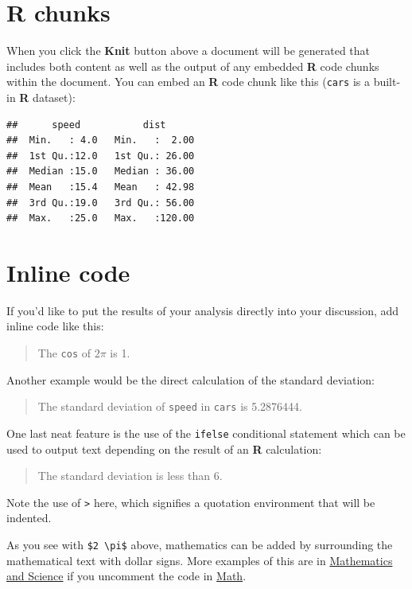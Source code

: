 \documentclass[print]{nuthesis}
\begin{document}
\hypertarget{r-chunks}{%
\section{R chunks}\label{r-chunks}}

When you click the \textbf{Knit} button above a document will be generated that includes both content as well as the output of any embedded \textbf{R} code chunks within the document. You can embed an \textbf{R} code chunk like this (\texttt{cars} is a built-in \textbf{R} dataset):

\begin{verbatim}
##      speed           dist       
##  Min.   : 4.0   Min.   :  2.00  
##  1st Qu.:12.0   1st Qu.: 26.00  
##  Median :15.0   Median : 36.00  
##  Mean   :15.4   Mean   : 42.98  
##  3rd Qu.:19.0   3rd Qu.: 56.00  
##  Max.   :25.0   Max.   :120.00
\end{verbatim}

\hypertarget{inline-code}{%
\section{Inline code}\label{inline-code}}

If you'd like to put the results of your analysis directly into your discussion, add inline code like this:

\begin{quote}
The \texttt{cos} of \(2 \pi\) is 1.
\end{quote}

Another example would be the direct calculation of the standard deviation:

\begin{quote}
The standard deviation of \texttt{speed} in \texttt{cars} is 5.2876444.
\end{quote}

One last neat feature is the use of the \texttt{ifelse} conditional statement which can be used to output text depending on the result of an \textbf{R} calculation:

\begin{quote}
The standard deviation is less than 6.
\end{quote}

Note the use of \texttt{\textgreater{}} here, which signifies a quotation environment that will be indented.

As you see with \texttt{\$2\ \textbackslash{}pi\$} above, mathematics can be added by surrounding the mathematical text with dollar signs. More examples of this are in \protect\hyperlink{math-sci}{Mathematics and Science} if you uncomment the code in \protect\hyperlink{math}{Math}.
\end{document}
